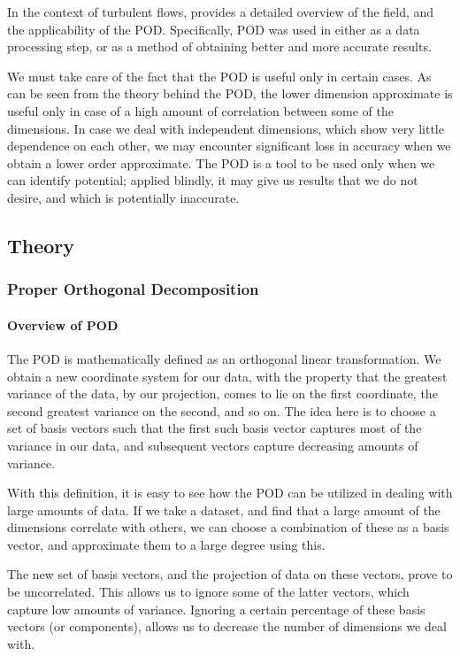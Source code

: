 \documentclass[submit]{aiaa-tc_mod}%
\begin{document}
In the context of turbulent flows, \cite{rowley} provides a detailed overview of the field, and the applicability of the POD. Specifically, POD was used in \cite{seng1, seng2, seng3, seng4} either as a data processing step, or as a method of obtaining better and more accurate results. 

We must take care of the fact that the POD is useful only in certain cases. As can be seen from the theory behind the POD, the lower dimension approximate is useful only in case of a high amount of correlation between some of the dimensions. In case we deal with independent dimensions, which show very little dependence on each other, we may encounter significant loss in accuracy when we obtain a lower order approximate. The POD is a tool to be used only when we can identify potential; applied blindly, it may give us results that we do not desire, and which is potentially inaccurate. 

\subsection{Theory}
\subsubsection{Proper Orthogonal Decomposition}
\paragraph{Overview of POD}
The POD is mathematically defined as an orthogonal linear transformation. We obtain a new coordinate system for our data, with the property that the greatest variance of the data, by our projection, comes to lie on the first coordinate, the second greatest variance on the second, and so on. The idea here is to choose a set of basis vectors such that the first such basis vector captures most of the variance in our data, and subsequent vectors capture decreasing amounts of variance.

With this definition, it is easy to see how the POD can be utilized in dealing with large amounts of data. If we take a dataset, and find that a large amount of the dimensions correlate with others, we can choose a combination of these as a basis vector, and approximate them to a large degree using this. 

The new set of basis vectors, and the projection of data on these vectors, prove to be uncorrelated. This allows us to ignore some of the latter vectors, which capture low amounts of variance. Ignoring a certain percentage of these basis vectors (or components), allows us to decrease the number of dimensions we deal with. 
\end{document}
